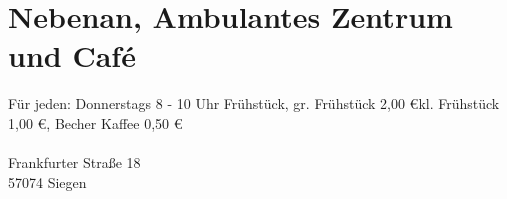 \section{Nebenan, Ambulantes Zentrum und Café }
Für jeden: Donnerstags 8 - 10 Uhr Frühstück, gr. Frühstück 2,00 \euro kl. Frühstück 1,00 \euro, Becher Kaffee  0,50 \euro \\
\\
Frankfurter Straße 18\\
57074 Siegen